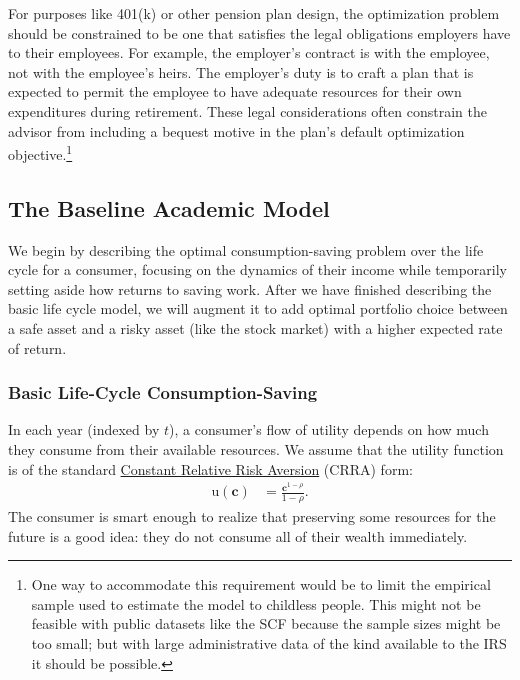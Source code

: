 \documentclass{article}
\newcommand{\CRRA}{\rho}
\newcommand{\uFunc}{\mathrm{u}}
\newcommand{\cLvl}{\mathbf{c}}
\begin{document}
For purposes like 401(k) or other pension plan design, the optimization problem should be constrained to be one that satisfies the legal obligations employers have to their employees.
For example, the employer's contract is with the employee, not with the employee's heirs.
The employer's duty is to craft a plan that is expected to permit the employee to have adequate resources for their own expenditures during retirement.
These legal considerations often constrain the advisor from including a bequest motive in the plan's default optimization objective.\footnote{One way to accommodate this requirement would be to limit the empirical sample used to estimate the model to childless people.
This might not be feasible with public datasets like the SCF because the sample sizes might be too small; but with large administrative data of the kind available to the IRS it should be possible.}

\subsection{The Baseline Academic Model}

We begin by describing the optimal consumption-saving problem over the life cycle for a consumer, focusing on the dynamics of their income while temporarily setting aside how returns to saving work.
After we have finished describing the basic life cycle model, we will augment it to add optimal portfolio choice between a safe asset and a risky asset (like the stock market) with a higher expected rate of return.

\subsubsection{Basic Life-Cycle Consumption-Saving}\label{basic-cs}

In each year (indexed by $t$), a consumer's flow of utility depends on how much they consume from their available resources.
We assume that the utility function is of the standard \href{https://en.wikipedia.org/wiki/Isoelastic\_utility}{Constant Relative Risk Aversion} (CRRA) form:
\begin{align}
    \uFunc(\cLvl) & = \frac{\cLvl^{1-\CRRA}}{1-\CRRA}.
\end{align}
The consumer is smart enough to realize that preserving some resources for the future is a good idea: they do not consume all of their wealth immediately.
\end{document}
